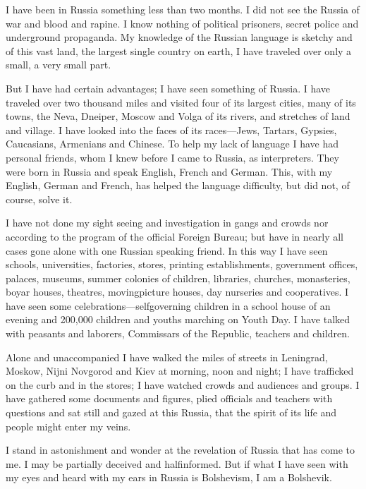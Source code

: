 \documentclass[letterpaper,10pt,english]{jupyterBook}
\begin{document}
\sphinxAtStartPar
I have been in Russia something less than two months. I did not see the Russia of war and blood and rapine. I know nothing of political prisoners, secret police and underground propaganda. My knowledge of the Russian language is sketchy and of this vast land, the largest single country on earth, I have traveled over only a small, a very small part.

\sphinxAtStartPar
But I have had certain advantages; I have seen something of Russia. I have traveled over two thousand miles and visited four of its largest cities, many of its towns, the Neva, Dneiper, Moscow and Volga of its rivers, and stretches of land and village. I have looked into the faces of its races—Jews, Tartars, Gypsies, Caucasians, Armenians and Chinese. To help my lack of language I have had personal friends, whom I knew before I came to Russia, as interpreters. They were born in Russia and speak English, French and German. This, with my English, German and French, has helped the language difficulty, but did not, of course, solve it.

\sphinxAtStartPar
I have not done my sight seeing and investigation in gangs and crowds nor according to the program of the official Foreign Bureau; but have in nearly all cases gone alone with one Russian speaking friend. In this way I have seen schools, universities, factories, stores, printing establishments, government offices, palaces, museums, summer colonies of children, libraries, churches, monasteries, boyar houses, theatres, moving\sphinxhyphen{}picture houses, day nurseries and co\sphinxhyphen{}operatives. I have seen some celebrations—self\sphinxhyphen{}governing children in a school house of an evening and 200,000 children and youths marching on Youth Day. I have talked with peasants and laborers, Commissars of the Republic, teachers and children.

\sphinxAtStartPar
Alone and unaccompanied I have walked the miles of streets in Leningrad, Moskow, Nijni Novgorod and Kiev at morning, noon and night; I have trafficked on the curb and in the stores; I have watched crowds and audiences and groups. I have gathered some documents and figures, plied officials and teachers with questions and sat still and gazed at this Russia, that the spirit of its life and people might enter my veins.

\sphinxAtStartPar
I stand in astonishment and wonder at the revelation of Russia that has come to me. I may be partially deceived and half\sphinxhyphen{}informed. But if what I have seen with my eyes and heard with my ears in Russia is Bolshevism, I am a Bolshevik.
\end{document}
